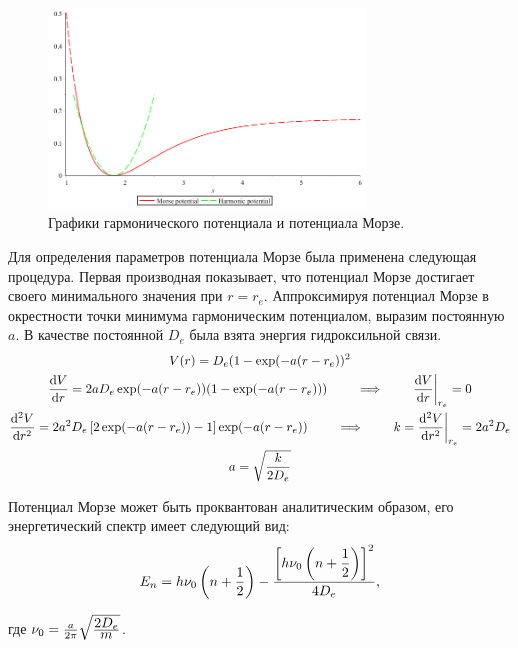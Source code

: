 \begin{figure}[H]
  \centering
	\includegraphics[width=0.75\textwidth]{../pictures/potentials.png}
	\caption{Графики гармонического потенциала и потенциала Морзе.}
\end{figure}


Для определения параметров потенциала Морзе была применена следующая процедура. Первая производная показывает, что потенциал Морзе достигает своего минимального значения при $r = r_e$. Аппроксимируя потенциал Морзе в окрестности точки минимума гармоническим потенциалом, выразим постоянную $a$. В качестве постоянной $D_e$ была взята энергия гидроксильной связи. 
\vverh
\begin{gather}
V(r) = D_e (1 - \exp (- a (r - r_e))^2 \notag \\
\frac{\mathrm{d}V}{\mathrm{d}r} = 2 a D_e \exp (- a (r - r_e)) (1 - \exp (-a (r - r_e))) 
\qquad \implies \qquad \frac{\mathrm{d}V}{\mathrm{d}r} \bigg{|}_{r_e} = 0 \notag \\
\frac{\mathrm{d}^2 V}{\mathrm{d}r^2} = 2 a^2 D_e \left[ 2 \exp (-a (r - r_e)) - 1 \right] \exp (-a (r - r_e)) \qquad \implies \qquad k = \frac{\mathrm{d}^2 V}{\mathrm{d}r^2} \bigg{|}_{r_e} = 2 a^2 D_e \notag \\
a = \sqrt{\frac{\displaystyle k}{\displaystyle 2D_e}} \notag
\end{gather}

Потенциал Морзе может быть проквантован аналитическим образом, его энергетический спектр имеет следующий вид:
\vverh
\begin{gather}
E_n = h \nu_0 \left( n + \frac{1}{2} \right) - \frac{\displaystyle \left[ h \nu_0 \left( n + \frac{1}{2} \right) \right]^2 }{\displaystyle 4 D_e}, \notag
\end{gather} 

\vlevo где $\nu_0 = \frac{a}{2 \pi} \sqrt{\frac{\displaystyle 2 D_e}{\displaystyle m}}$.